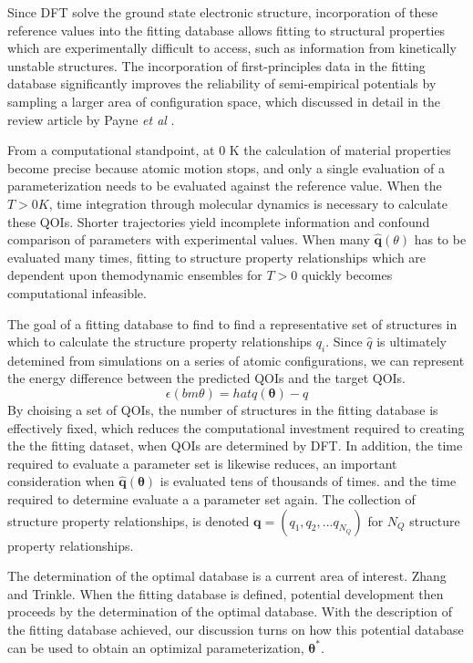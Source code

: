 Since DFT solve the ground state electronic structure, incorporation of these reference values into the fitting database allows fitting to structural properties which are experimentally difficult to access, such as information from kinetically unstable structures.  The incorporation of first-principles data in the fitting database significantly improves the reliability of semi-empirical potentials by sampling a larger area of configuration space, which discussed in detail in the review article by Payne \emph{et al} \cite{payne1996_dft_database}.

From a computational standpoint, at $0$ K the calculation of material properties become precise because atomic motion stops, and only a single evaluation of a parameterization needs to be evaluated against the reference value.  When the $T>0 K$, time integration through molecular dynamics is necessary to calculate these QOIs.  Shorter trajectories yield incomplete information and confound comparison of parameters with experimental values.  When many $\hat{\bm{q}}(\theta)$ has to be evaluated many times, fitting to structure property relationships which are dependent upon themodynamic ensembles for $T>0$ quickly becomes computational infeasible.

The goal of a fitting database to find to find a representative set of structures in which to calculate the structure property relationships $q_i$.  Since $\hat{q}$ is ultimately detemined from simulations on a series of atomic configurations, we can represent the energy difference between the predicted QOIs and the target QOIs.
\begin{equation}
	\epsilon(bm{\theta})=hat{q}(\bm{\theta})-q
\end{equation}
By choising a set of QOIs, the number of structures in the fitting database is effectively fixed, which reduces the computational investment required to creating the the fitting dataset, when QOIs are determined by DFT.  In addition, the time required to evaluate a parameter set is likewise reduces, an important consideration when $\hat{\bm{q}}(\bm{\theta})$ is evaluated tens of thousands of times. and the time required to determine evaluate a a parameter set again.  The collection of structure property relationships, is denoted $\bm{q}=(q_1,q_2,...q_{N_Q})$ for $N_Q$ structure property relationships.

The determination of the optimal database is a current area of interest.  Zhang and Trinkle\cite{zhang2015_bayes_fitttingdb}.  When the fitting database is defined, potential development then proceeds by the determination of the optimal database.  With the description of the fitting database achieved, our discussion turns on how this potential database can be used to obtain an optimizal parameterization, $\bm{\theta}^*$.

